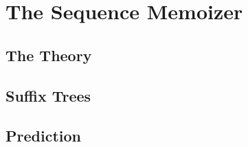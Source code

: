 \chapter{The Sequence Memoizer} \label{chap:seqMem}


\section{The Theory}

\section{Suffix Trees}

\section{Prediction}